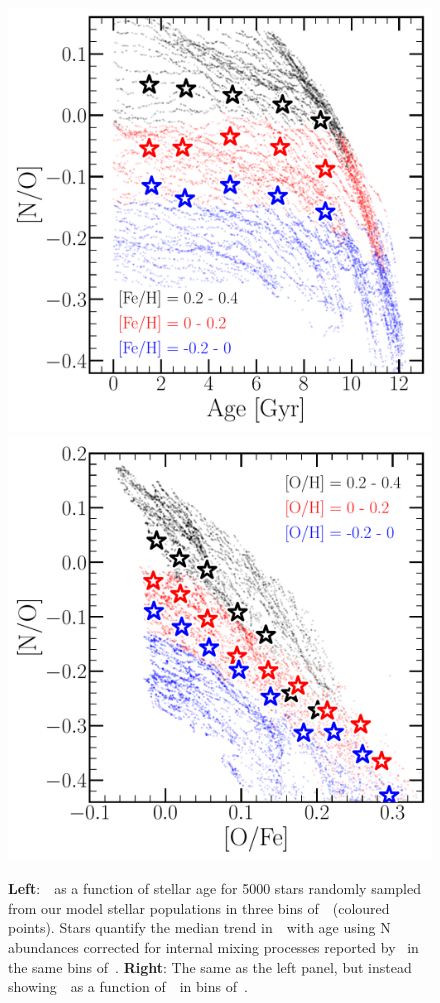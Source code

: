 \documentclass[ms.tex]{subfiles}
\begin{document}
\begin{figure}
\centering
\includegraphics[scale = 0.45]{no_vs_age.pdf}
\includegraphics[scale = 0.45]{no_vs_ofe.pdf}
\caption{
\textbf{Left}:~\no~as a function of stellar age for 5000 stars randomly
sampled from our model stellar populations in three bins of~\feh~(coloured 
points).
Stars quantify the median trend in~\no~with age using N abundances corrected
for internal mixing processes reported by~\citet{Vincenzo2021} in the same
bins of~\feh.
\textbf{Right}: The same as the left panel, but instead showing~\no~as a
function of~\ofe~in bins of~\oh.
}
\label{fig:vincenzo_comp}
\end{figure}
\end{document}
